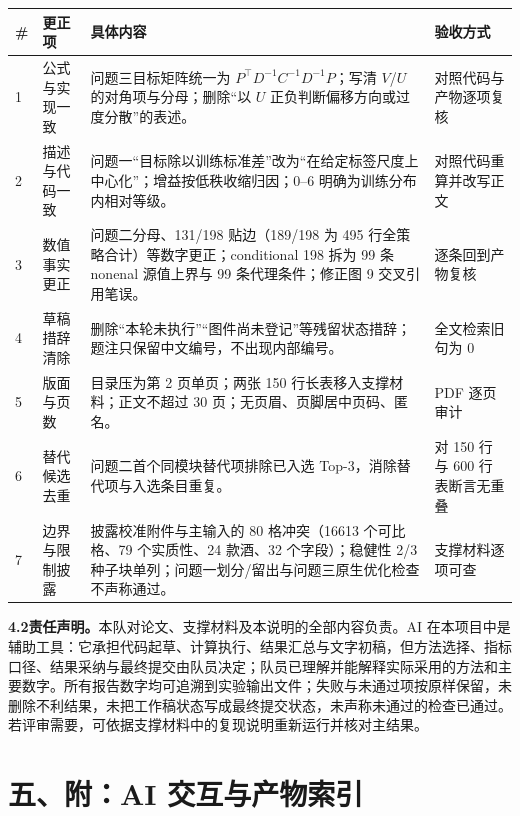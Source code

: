 \documentclass[11pt,a4paper]{article}
\renewcommand{\arraystretch}{1.12}
\begin{document}
\begin{center}
\begin{minipage}{\linewidth}
\centering
\renewcommand{\arraystretch}{1.04}
\footnotesize
\begin{tabular}{@{}p{0.6cm}p{2.6cm}p{8.0cm}p{3.4cm}@{}}
\toprule
\# & 更正项 & 具体内容 & 验收方式 \\
\midrule
1 & 公式与实现一致 & 问题三目标矩阵统一为 $P^{\top}D^{-1}C^{-1}D^{-1}P$；写清 $V$/$U$ 的对角项与分母；删除“以 $U$ 正负判断偏移方向或过度分散”的表述。 & 对照代码与产物逐项复核 \\
2 & 描述与代码一致 & 问题一“目标除以训练标准差”改为“在给定标签尺度上中心化”；增益按低秩收缩归因；0--6 明确为训练分布内相对等级。 & 对照代码重算并改写正文 \\
3 & 数值事实更正 & 问题二分母、131/198 贴边（189/198 为 495 行全策略合计）等数字更正；conditional 198 拆为 99 条 nonenal 源值上界与 99 条代理条件；修正图 9 交叉引用笔误。 & 逐条回到产物复核 \\
4 & 草稿措辞清除 & 删除“本轮未执行”“图件尚未登记”等残留状态措辞；题注只保留中文编号，不出现内部编号。 & 全文检索旧句为 0 \\
5 & 版面与页数 & 目录压为第 2 页单页；两张 150 行长表移入支撑材料；正文不超过 30 页；无页眉、页脚居中页码、匿名。 & PDF 逐页审计 \\
6 & 替代候选去重 & 问题二首个同模块替代项排除已入选 Top-3，消除替代项与入选条目重复。 & 对 150 行与 600 行表断言无重叠 \\
7 & 边界与限制披露 & 披露校准附件与主输入的 80 格冲突（16613 个可比格、79 个实质性、24 款酒、32 个字段）；稳健性 2/3 种子块单列；问题一划分/留出与问题三原生优化检查不声称通过。 & 支撑材料逐项可查 \\
\bottomrule
\end{tabular}
\end{minipage}
\end{center}

\textbf{4.2\quad 责任声明。}\quad 本队对论文、支撑材料及本说明的全部内容负责。AI 在本项目中是辅助工具：它承担代码起草、计算执行、结果汇总与文字初稿，但方法选择、指标口径、结果采纳与最终提交由队员决定；队员已理解并能解释实际采用的方法和主要数字。所有报告数字均可追溯到实验输出文件；失败与未通过项按原样保留，未删除不利结果，未把工作稿状态写成最终提交状态，未声称未通过的检查已通过。若评审需要，可依据支撑材料中的复现说明重新运行并核对主结果。

\section*{五、附：AI 交互与产物索引}
\end{document}
